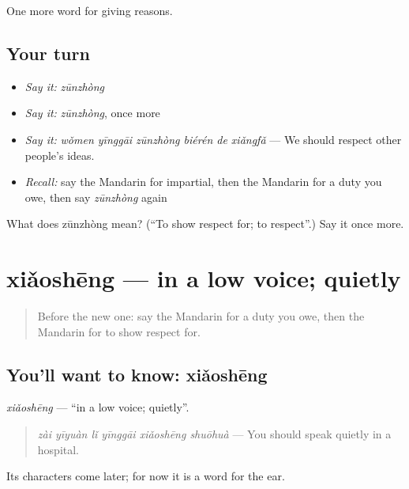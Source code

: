 \begin{grammarlens}[title={What you've built}]
One more word for giving reasons.
\end{grammarlens}

\subsection*{Your turn}
\begin{itemize}
\raggedright
  \item \emph{Say it:} \emph{zūnzhòng}
  \item \emph{Say it:} \emph{zūnzhòng}, once more
  \item \emph{Say it:} \emph{wǒmen yīnggāi zūnzhòng biérén de xiǎngfǎ} — We should respect other people's ideas.
  \item \emph{Recall:} say the Mandarin for impartial, then the Mandarin for a duty you owe, then say \emph{zūnzhòng} again
\end{itemize}

\begin{tcolorbox}[breakable,colback=teal!4,colframe=teal!35!black,title={Before you move on}]
What does zūnzhòng mean? (\textquotedblleft{}To show respect for; to respect\textquotedblright{}.) Say it once more.
\end{tcolorbox}
\section[xiǎoshēng]{xiǎoshēng — in a low voice; quietly}

\label{lesson:ZH-C363-xiaosheng}



\begin{quote}
Before the new one: say the Mandarin for a duty you owe, then the Mandarin for to show respect for.
\end{quote}

\subsection*{You'll want to know: xiǎoshēng}
\emph{xiǎoshēng} — \textquotedblleft{}in a low voice; quietly\textquotedblright{}.

\begin{quote}
\emph{zài yīyuàn lǐ yīnggāi xiǎoshēng shuōhuà} — You should speak quietly in a hospital.
\end{quote}

Its characters come later; for now it is a word for the ear.

